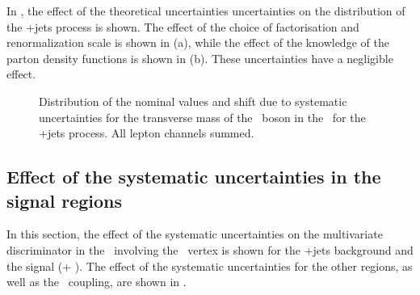 \newpage
In , the effect of the theoretical uncertainties uncertainties on the distribution of the \WZ+jets process is shown. The effect of the choice of factorisation and renormalization scale is shown in  (a), while the effect of the knowledge of the parton density functions is shown in  (b). These uncertainties have a negligible effect. 
\begin{figure}[htbp] 
	\centering 

	\caption{Distribution of the nominal values and shift due to  systematic uncertainties for the transverse mass of the \PW\ boson in the \WZCR\ for the \WZ+jets process. All lepton channels summed.}
	\label{fig:shiftMTWt}
\end{figure}


\subsection{Effect of the systematic uncertainties in the signal regions}
\label{sec:BDTsys}
In this section, the effect of the systematic uncertainties on the multivariate discriminator in the \STSR\ involving the \Zut\ vertex is shown for the \WZ+jets background and the signal (\tZ + \tZq). The effect of the systematic uncertainties for the other regions, as well as the \Zct\ coupling, are shown in . 

